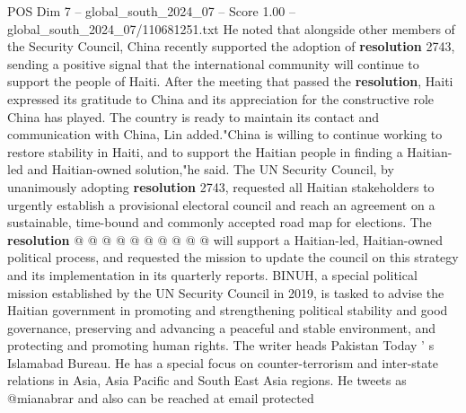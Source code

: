 \begin{textsample}{POS Dim 7 – global\_south\_2024\_07 – Score 1.00 – global\_south\_2024\_07/110681251.txt}
He noted that alongside other members of the Security Council, China recently supported the adoption of \textbf{resolution} 2743, sending a positive signal that the international community will continue to support the people of Haiti.
After the meeting that passed the \textbf{resolution}, Haiti expressed its gratitude to China and its appreciation for the constructive role China has played.
The country is ready to maintain its contact and communication with China, Lin added."China is willing to continue working to restore stability in Haiti, and to support the Haitian people in finding a Haitian-led and Haitian-owned solution,"he said.
The UN Security Council, by unanimously adopting \textbf{resolution} 2743, requested all Haitian stakeholders to urgently establish a provisional electoral council and reach an agreement on a sustainable, time-bound and commonly accepted road map for elections.
The \textbf{resolution} @ @ @ @ @ @ @ @ @ @ will support a Haitian-led, Haitian-owned political process, and requested the mission to update the council on this strategy and its implementation in its quarterly reports.
BINUH, a special political mission established by the UN Security Council in 2019, is tasked to advise the Haitian government in promoting and strengthening political stability and good governance, preserving and advancing a peaceful and stable environment, and protecting and promoting human rights.
The writer heads Pakistan Today ' s Islamabad Bureau.
He has a special focus on counter-terrorism and inter-state relations in Asia, Asia Pacific and South East Asia regions.
He tweets as @mianabrar and also can be reached at email protected

\end{textsample}
